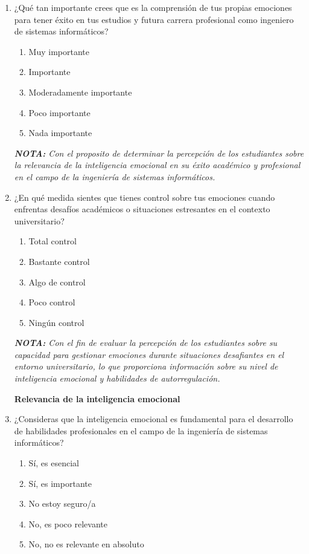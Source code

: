 \documentclass[journal]{IEEEtran}
\begin{document}
\begin{enumerate}
	\item ¿Qué tan importante crees que es la comprensión de tus propias emociones para tener éxito en tus estudios y futura carrera profesional como ingeniero de sistemas informáticos?
	\begin{enumerate}
		\item Muy importante
		\item Importante
		\item Moderadamente importante
		\item Poco importante
		\item Nada importante
	\end{enumerate}
	\textit{\textbf{NOTA:} Con el proposito de determinar la percepción de los estudiantes sobre la relevancia de la inteligencia emocional en su 		éxito académico y profesional en el campo de la ingeniería de sistemas informáticos.}
	\item ¿En qué medida sientes que tienes control sobre tus emociones cuando enfrentas desafíos académicos o situaciones estresantes en el contexto universitario?
	\begin{enumerate}
		\item Total control
		\item Bastante control
		\item Algo de control
		\item Poco control
		\item Ningún control
	\end{enumerate}
	\textit{\textbf{NOTA:} Con el fin de evaluar la percepción de los estudiantes sobre su capacidad para gestionar emociones durante 				situaciones desafiantes en el entorno universitario, lo que proporciona información sobre su nivel de inteligencia emocional y habilidades de 		autorregulación.}
	\begin{center}
	\textbf{Relevancia de la inteligencia emocional}
	\end{center}
	\item ¿Consideras que la inteligencia emocional es fundamental para el desarrollo de habilidades profesionales en el campo de la ingeniería de sistemas informáticos?
	\begin{enumerate}
		\item Sí, es esencial
		\item Sí, es importante
		\item No estoy seguro/a
		\item No, es poco relevante
		\item No, no es relevante en absoluto
	\end{enumerate}

\end{enumerate}
\end{document}
